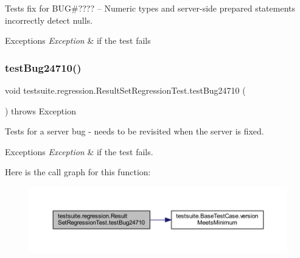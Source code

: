 Tests fix for B\+UG\#???? -- Numeric types and server-\/side prepared statements incorrectly detect nulls.


\begin{DoxyExceptions}{Exceptions}
{\em Exception} & if the test fails \\
\hline
\end{DoxyExceptions}
\mbox{\label{classtestsuite_1_1regression_1_1_result_set_regression_test_a5ac3cc852f40725510fa770bc496ae90}} 
\subsubsection{\texorpdfstring{test\+Bug24710()}{testBug24710()}}
{\footnotesize\ttfamily void testsuite.\+regression.\+Result\+Set\+Regression\+Test.\+test\+Bug24710 (\begin{DoxyParamCaption}{ }\end{DoxyParamCaption}) throws Exception}

Tests for a server bug -\/ needs to be revisited when the server is fixed.


\begin{DoxyExceptions}{Exceptions}
{\em Exception} & if the test fails. \\
\hline
\end{DoxyExceptions}
Here is the call graph for this function\+:
\nopagebreak
\begin{figure}[H]
\begin{center}
\leavevmode
\includegraphics[width=350pt]{classtestsuite_1_1regression_1_1_result_set_regression_test_a5ac3cc852f40725510fa770bc496ae90_cgraph}
\end{center}
\end{figure}
\mbox{\label{classtestsuite_1_1regression_1_1_result_set_regression_test_a7bcbd9c43496a10671c61673ef66c817}} 
